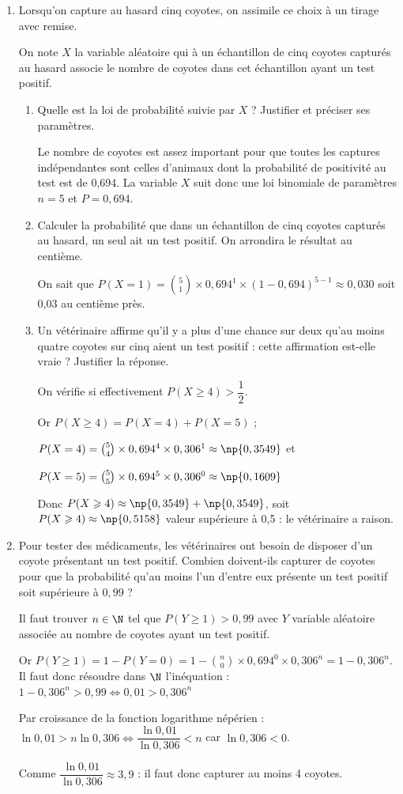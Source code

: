 \begin{enumerate}
\item Lorsqu'on capture au hasard cinq coyotes, on assimile ce choix à un tirage avec remise.

On note $X$ la variable aléatoire qui à un échantillon de cinq coyotes capturés au hasard associe le nombre de coyotes dans cet échantillon ayant un test positif.
\begin{enumerate}
\item Quelle est la loi de probabilité suivie par $X$ ? Justifier et préciser ses paramètres.

Le nombre de coyotes est assez important pour que toutes les captures indépendantes sont celles d'animaux dont la probabilité de positivité au test est de 0,694. La variable $X$ suit donc une loi binomiale de paramètres $n = 5$ et $P = 0,694$.
\item Calculer la probabilité que dans un échantillon de cinq coyotes capturés au hasard, un seul ait un test positif. On arrondira le résultat au centième.

On sait que $P(X = 1) = \binom{5}{1} \times 0,694^1 \times (1 - 0,694)^{5 - 1} \approx 0,030$ soit 0,03 au centième près.
\item Un vétérinaire affirme qu'il y a plus d'une chance sur deux qu'au moins quatre coyotes sur cinq aient un test positif : cette affirmation est-elle vraie ? Justifier la réponse.

On vérifie si effectivement $P(X \geqslant 4) > \dfrac{1}{2}$.

Or $P(X \geqslant 4) = P(X = 4) + P(X = 5)$ ;

$P(X = 4) = \binom{5}{4}\times 0,694^4 \times 0,306^1 \approx \np{0,3549}$ et 

$P(X = 5) = \binom{5}{5}\times 0,694^5 \times 0,306^0 \approx \np{0,1609}$

Donc $P(X \geqslant 4) \approx \np{0,3549} + \np{0,3549}$, soit $P(X \geqslant 4) \approx \np{0,5158}$ valeur supérieure à 0,5 : le vétérinaire a raison.
	\end{enumerate}	
\item Pour tester des médicaments, les vétérinaires ont besoin de disposer d'un coyote présentant un test positif. Combien doivent-ils capturer de coyotes pour que la probabilité qu'au moins l'un d'entre eux présente un test positif soit supérieure à $0,99$ ?

Il faut trouver $n \in \N$ tel que $P(Y \geqslant 1) > 0,99$ avec $Y$ variable aléatoire associée au nombre de coyotes ayant un test positif.

Or $P(Y \geqslant 1) = 1 - P(Y = 0) = 1 - \binom{n}{0}\times 0,694^0 \times 0,306^n = 1 - 0,306^n$.
Il faut donc résoudre dans $\N$ l'inéquation : $1 - 0,306^n > 0,99 \iff 0,01 > 0,306^n$

Par croissance de la fonction logarithme népérien : $\ln 0,01 > n \ln 0,306 \iff \dfrac{\ln 0,01}{\ln 0,306} < n$ car $\ln 0,306 < 0$.

Comme $\dfrac{\ln 0,01}{\ln 0,306} \approx 3,9$ : il faut donc capturer au moins 4 coyotes.
\end{enumerate}

\bigskip
